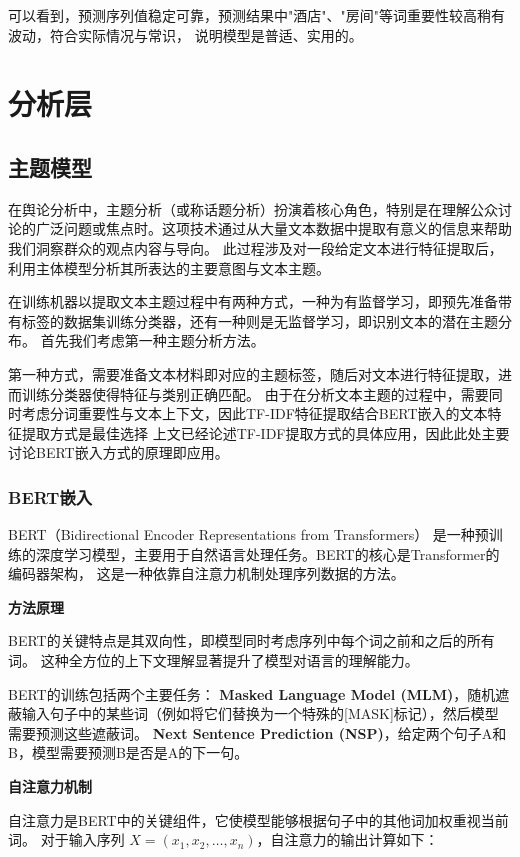 \documentclass[UTF8,a4paper,15pt,titlepage,oneside]{ctexbook}
\begin{document}
可以看到，预测序列值稳定可靠，预测结果中"酒店"、"房间"等词重要性较高稍有波动，符合实际情况与常识，
说明模型是普适、实用的。

\section{分析层}

\subsection{主题模型}

在舆论分析中，主题分析（或称话题分析）扮演着核心角色，特别是在理解公众讨论的广泛问题或焦点时。这项技术通过从大量文本数据中提取有意义的信息来帮助我们洞察群众的观点内容与导向。
此过程涉及对一段给定文本进行特征提取后，利用主体模型分析其所表达的主要意图与文本主题。

在训练机器以提取文本主题过程中有两种方式，一种为有监督学习，即预先准备带有标签的数据集训练分类器，还有一种则是无监督学习，即识别文本的潜在主题分布。
首先我们考虑第一种主题分析方法。


第一种方式，需要准备文本材料即对应的主题标签，随后对文本进行特征提取，进而训练分类器使得特征与类别正确匹配。
由于在分析文本主题的过程中，需要同时考虑分词重要性与文本上下文，因此TF-IDF特征提取结合BERT嵌入的文本特征提取方式是最佳选择
上文已经论述TF-IDF提取方式的具体应用，因此此处主要讨论BERT嵌入方式的原理即应用。

\subsubsection{BERT嵌入}

BERT（Bidirectional Encoder Representations from Transformers）
是一种预训练的深度学习模型，主要用于自然语言处理任务。BERT的核心是Transformer的编码器架构，
这是一种依靠自注意力机制处理序列数据的方法。

\vskip 0.2cm
\noindent
\textbf{方法原理}

BERT的关键特点是其双向性，即模型同时考虑序列中每个词之前和之后的所有词。
这种全方位的上下文理解显著提升了模型对语言的理解能力。

BERT的训练包括两个主要任务：
\textbf{Masked Language Model (MLM)}，随机遮蔽输入句子中的某些词（例如将它们替换为一个特殊的[MASK]标记），然后模型需要预测这些遮蔽词。
\textbf{Next Sentence Prediction (NSP)}，给定两个句子A和B，模型需要预测B是否是A的下一句。


\vskip 0.2cm
\noindent
\textbf{自注意力机制}

自注意力是BERT中的关键组件，它使模型能够根据句子中的其他词加权重视当前词。
对于输入序列 \(X = (x_1, x_2, \ldots, x_n)\)，自注意力的输出计算如下：
\end{document}
